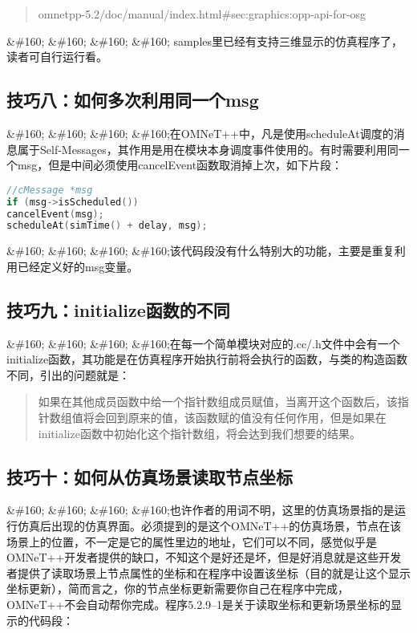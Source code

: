 \begin{quote}
omnetpp-5.2\slash doc\slash manual\slash index.html\#sec:graphics:opp-api-for-osg 
\end{quote}

\&\#160; \&\#160; \&\#160; \&\#160; samples里已经有支持三维显示的仿真程序了，读者可自行运行看。

\subsection{技巧八：如何多次利用同一个msg}
\label{技巧八：如何多次利用同一个bmsgb}

\&\#160; \&\#160; \&\#160; \&\#160;在OMNeT++中，凡是使用scheduleAt调度的消息属于Self-Messages，其作用是用在模块本身调度事件使用的。有时需要利用同一个msg，但是中间必须使用cancelEvent函数取消掉上次，如下片段：

\begin{lstlisting}[language=c]
//cMessage *msg
if (msg->isScheduled())
cancelEvent(msg);
scheduleAt(simTime() + delay, msg);
\end{lstlisting}

\&\#160; \&\#160; \&\#160; \&\#160;该代码段没有什么特别大的功能，主要是重复利用已经定义好的msg变量。

\subsection{技巧九：initialize函数的不同}
\label{技巧九：initialize函数的不同}

\&\#160; \&\#160; \&\#160; \&\#160;在每一个简单模块对应的.cc\slash .h文件中会有一个initialize函数，其功能是在仿真程序开始执行前将会执行的函数，与类的构造函数不同，引出的问题就是：

\begin{quote}
如果在其他成员函数中给一个指针数组成员赋值，当离开这个函数后，该指针数组值将会回到原来的值，该函数赋的值没有任何作用，但是如果在initialize函数中初始化这个指针数组，将会达到我们想要的结果。
\end{quote}

\subsection{技巧十：如何从仿真场景读取节点坐标}
\label{技巧十：如何从仿真场景读取节点坐标}

\&\#160; \&\#160; \&\#160; \&\#160;也许作者的用词不明，这里的仿真场景指的是运行仿真后出现的仿真界面。必须提到的是这个OMNeT++的仿真场景，节点在该场景上的位置，不一定是它的属性里边的地址，它们可以不同，感觉似乎是OMNeT++开发者提供的缺口，不知这个是好还是坏，但是好消息就是这些开发者提供了读取场景上节点属性的坐标和在程序中设置该坐标（目的就是让这个显示坐标更新），简而言之，你的节点坐标更新需要你自己在程序中完成，OMNeT++不会自动帮你完成。程序5.2.9--1是关于读取坐标和更新场景坐标的显示的代码段：


